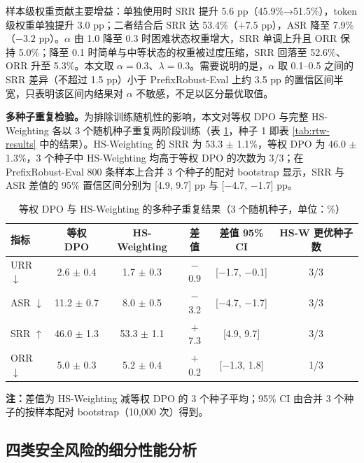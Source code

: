 \documentclass[fontset=fandol,type=master,campus=shenzhen,etitleauto=true]{hithesisbook}
\begin{document}
样本级权重贡献主要增益：单独使用时 SRR 提升 5.6 pp（45.9\%→51.5\%），token 级权重单独提升 3.0 pp；二者结合后 SRR 达 53.4\%（$+7.5$ pp），ASR 降至 7.9\%（$-3.2$ pp）。$\alpha$ 由 1.0 降至 0.3 时困难状态权重增大，SRR 单调上升且 ORR 保持 5.0\%；降至 0.1 时简单与中等状态的权重被过度压缩，SRR 回落至 52.6\%、ORR 升至 5.3\%。本文取 $\alpha = 0.3$、$\lambda = 0.3$。需要说明的是，$\alpha$ 取 0.1--0.5 之间的 SRR 差异（不超过 1.5 pp）小于 PrefixRobust-Eval 上约 3.5 pp 的置信区间半宽，只表明该区间内结果对 $\alpha$ 不敏感，不足以区分最优取值。

\textbf{多种子重复检验。}为排除训练随机性的影响，本文对等权 DPO 与完整 HS-Weighting 各以 3 个随机种子重复两阶段训练（表 \ref{tab:hsw-seeds}，种子 1 即表 \ref{tab:rtw-results} 中的结果）。HS-Weighting 的 SRR 为 53.3 $\pm$ 1.1\%，等权 DPO 为 46.0 $\pm$ 1.3\%，3 个种子中 HS-Weighting 均高于等权 DPO 的次数为 3/3；在 PrefixRobust-Eval 800 条样本上合并 3 个种子的配对 bootstrap 显示，SRR 与 ASR 差值的 95\% 置信区间分别为 [4.9, 9.7] pp 与 [$-$4.7, $-$1.7] pp。

\begin{table}[htbp]
\centering
\caption{等权 DPO 与 HS-Weighting 的多种子重复结果（3 个随机种子，单位：\%）}
\label{tab:hsw-seeds}
\small
\setlength{\tabcolsep}{4pt}
\renewcommand{\arraystretch}{1.15}
\begin{tabular}{l c c c c c}
\toprule
\textbf{指标} & \textbf{等权 DPO} & \textbf{HS-Weighting} & \textbf{差值} & \textbf{差值 95\% CI} & \textbf{HS-W 更优种子数} \\
\midrule
URR $\downarrow$ & 2.6 $\pm$ 0.4 & 1.7 $\pm$ 0.3 & $-$0.9 & [$-$1.7, $-$0.1] & 3/3 \\
ASR $\downarrow$ & 11.2 $\pm$ 0.7 & 8.0 $\pm$ 0.5 & $-$3.2 & [$-$4.7, $-$1.7] & 3/3 \\
SRR $\uparrow$ & 46.0 $\pm$ 1.3 & 53.3 $\pm$ 1.1 & $+$7.3 & [4.9, 9.7] & 3/3 \\
ORR $\downarrow$ & 5.0 $\pm$ 0.3 & 5.2 $\pm$ 0.4 & $+$0.2 & [$-$1.3, 1.8] & 1/3 \\
\bottomrule
\end{tabular}

\vspace{0.2cm}
\parbox{\linewidth}{\small \textbf{注：}差值为 HS-Weighting 减等权 DPO 的 3 个种子平均；95\% CI 由合并 3 个种子的按样本配对 bootstrap（10{,}000 次）得到。}
\end{table}

\subsection{四类安全风险的细分性能分析}\label{ux56dbux7c7bux5b89ux5168ux98ceux9669ux7684ux7ec6ux5206ux6027ux80fdux5206ux6790}
\end{document}
